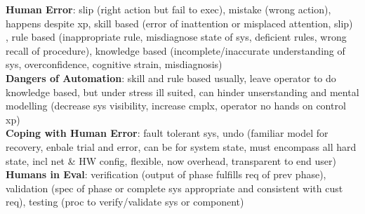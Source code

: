 \documentclass[a4paper]{article}
\begin{document}
\begin{multicols}{3}
        \textbf{Human Error}: slip (right action but fail to exec), mistake (wrong action), happens despite xp, skill based (error of inattention or misplaced attention, slip)\\, rule based (inappropriate rule, misdiagnose state of sys, deficient rules, wrong recall of procedure), knowledge based (incomplete/inaccurate understanding of sys, overconfidence, cognitive strain, misdiagnosis)\\
        \textbf{Dangers of Automation}: skill and rule based usually, leave operator to do knowledge based, but under stress ill suited, can hinder unserstanding and mental modelling (decrease sys visibility, increase cmplx, operator no hands on control xp)\\
        \textbf{Coping with Human Error}: fault tolerant sys, undo (familiar model for recovery, enbale trial and error, can be for system state, must encompass all hard state, incl net \& HW config, flexible, now overhead, transparent to end user)\\
        \textbf{Humans in Eval}: verification (output of phase fulfills req of prev phase), validation (spec of phase or complete sys appropriate and consistent with cust req), testing (proc to verify/validate sys or component)\\
    \end{multicols}
    
\end{document}
